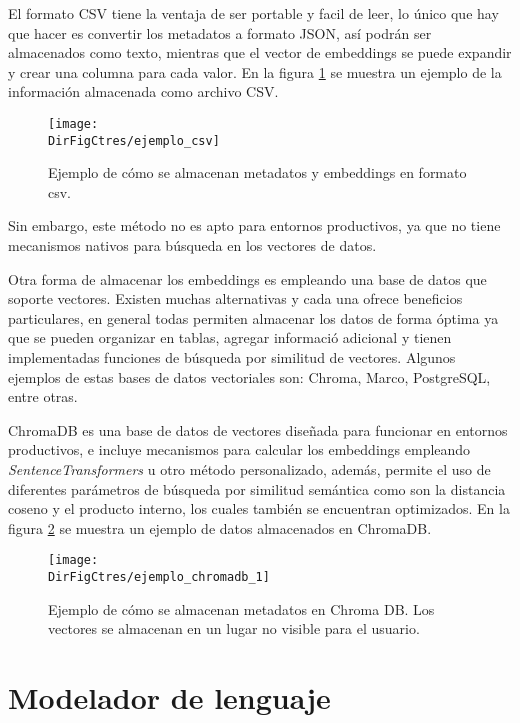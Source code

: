 El formato CSV tiene la ventaja de ser portable y facil de leer, lo único que
hay que hacer es convertir los metadatos a formato JSON, así podrán ser
almacenados como texto, mientras que el vector de embeddings se puede
expandir y crear una columna para cada valor. En la figura \ref{fig:ejemplo_csv}
se muestra un ejemplo de la información almacenada como archivo CSV.

\begin{figure}[]
    \centering
    \texttt{[image: \\DirFigCtres/ejemplo\_csv]}
    \caption{Ejemplo de cómo se almacenan metadatos y embeddings en formato csv.}
    \label{fig:ejemplo_csv}
\end{figure}

Sin embargo, este método no es apto para entornos productivos, ya que no tiene
mecanismos nativos para búsqueda en los vectores de datos.

Otra forma de almacenar los embeddings es empleando una base de datos que
soporte vectores. Existen muchas alternativas y cada una ofrece beneficios
particulares, en general todas permiten almacenar los datos de forma
óptima ya que se pueden organizar en tablas, agregar informació adicional y
tienen implementadas funciones de búsqueda por similitud de vectores.
Algunos ejemplos de estas bases de datos vectoriales son: Chroma, Marco,
PostgreSQL, entre otras.

ChromaDB es una base de datos de vectores diseñada para funcionar en
entornos productivos, e incluye mecanismos para calcular los embeddings
empleando \textit{SentenceTransformers} u otro método personalizado, además,
permite el uso de diferentes parámetros de búsqueda por similitud semántica
como son la distancia coseno y el producto interno, los cuales también se
encuentran optimizados. En la figura \ref{fig:ejemplo_chromadb} se muestra
un ejemplo de datos almacenados en ChromaDB.

\begin{figure}[]
    \centering
    \texttt{[image: \\DirFigCtres/ejemplo\_chromadb\_1]}
    \caption{Ejemplo de cómo se almacenan metadatos en Chroma DB. Los vectores
        se almacenan en un lugar no visible para el usuario.}
    \label{fig:ejemplo_chromadb}
\end{figure}

\section{Modelador de lenguaje}

